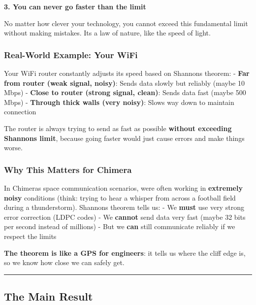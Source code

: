 \textbf{3. You can never go faster than the limit}

No matter how clever your technology, you cannot exceed this fundamental
limit without making mistakes. It\textquotesingle s a law of nature,
like the speed of light.

\subsubsection{Real-World Example: Your
WiFi}\label{real-world-example-your-wifi}

Your WiFi router constantly adjusts its speed based on
Shannon\textquotesingle s theorem: - \textbf{Far from router (weak
signal, noisy)}: Sends data slowly but reliably (maybe 10 Mbps) -
\textbf{Close to router (strong signal, clean)}: Sends data fast (maybe
500 Mbps) - \textbf{Through thick walls (very noisy)}: Slows way down to
maintain connection

The router is always trying to send as fast as possible \textbf{without
exceeding Shannon\textquotesingle s limit}, because going faster would
just cause errors and make things worse.

\subsubsection{Why This Matters for
Chimera}\label{why-this-matters-for-chimera}

In Chimera\textquotesingle s space communication scenarios,
we\textquotesingle re often working in \textbf{extremely noisy}
conditions (think: trying to hear a whisper from across a football field
during a thunderstorm). Shannon\textquotesingle s theorem tells us: - We
\textbf{must} use very strong error correction (LDPC codes) - We
\textbf{cannot} send data very fast (maybe 32 bits per second instead of
millions) - But we \textbf{can} still communicate reliably if we respect
the limits

\textbf{The theorem is like a GPS for engineers}: it tells us where the
cliff edge is, so we know how close we can safely get.

\begin{center}\rule{0.5\linewidth}{0.5pt}\end{center}

\subsection{\texorpdfstring{ The Main
Result}{ The Main Result}}\label{the-main-result}

